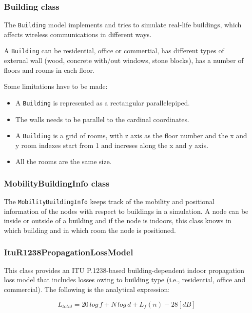 \subsubsection{Building class}

The \texttt{Building} model implements and tries to simulate real-life buildings, which affects
wireless communications in different ways.

A \texttt{Building} can be residential, office or commertial, has different types of external
wall (wood, concrete with/out windows, stone blocks), has a number of floors and rooms in each floor.

Some limitations have to be made:
\begin{itemize}[topsep=0pt]
  \item A \texttt{Building} is represented as a rectangular parallelepiped.
  \item The walls needs to be parallel to the cardinal coordinates.
  \item A \texttt{Building} is a grid of rooms, with z axis as the floor number and the x and y room
  indexes start from 1 and increses along the x and y axis.
  \item All the rooms are the same size.
\end{itemize}

\subsubsection{MobilityBuildingInfo class}

The \texttt{MobilityBuildingInfo} keeps track of the mobility and positional information of 
the nodes with respect to buildings in a simulation. A node can be inside or outside of
a building and if the node is indoors, this class knows in which building and in which room
the node is positioned.

\subsubsection{ItuR1238PropagationLossModel}

This class provides an ITU P.1238-based building-dependent indoor propagation loss model 
that includes losses owing to building type (i.e., residential, office and commercial). 
The following is the analytical expression:

\begin{equation}
  L_{total} = 20\,log\,f + N\,log\,d + L_f (n) - 28[dB]
\end{equation}


